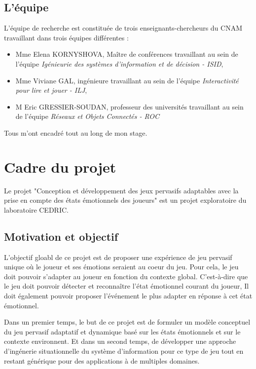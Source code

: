 \documentclass{article}
\begin{document}
	\subsection{L'équipe}
		L'équipe de recherche est constituée de trois enseignants-chercheurs du CNAM travaillant dans trois équipes différentes :
		\begin{itemize}
			\item Mme Elena KORNYSHOVA, Maître de conférences travaillant au sein de l'équipe \textit{Igénieurie des systèmes d'information et de décision - ISID}, 
			\item Mme Viviane GAL, ingénieure travaillant au sein de l'équipe \textit{Interactivité pour lire et jouer - ILJ},
			\item M Eric GRESSIER-SOUDAN, professeur des universités travaillant au sein de l'équipe \textit{Réseaux et Objets Connectés - ROC}
		\end{itemize}
		Tous m'ont encadré tout au long de mon stage.

\section{Cadre du projet}
	Le projet "Conception et développement des jeux pervasifs adaptables avec la prise en compte des états émotionnels des joueurs" est un projet exploratoire du laboratoire CEDRIC.
	\subsection{Motivation et objectif}
		L'objectif gloabl de ce projet est de proposer une expérience de jeu pervasif unique où le joueur et ses émotions seraient au coeur du jeu. 
		Pour cela, le jeu doit pouvoir s'adapter au joueur en fonction du contexte global. 
		C'est-à-dire que le jeu doit pouvoir détecter et reconnaître l'état émotionnel courant du joueur,
		Il doit également pouvoir proposer l'événement le plus adapter en réponse à cet état émotionnel.\par
		Dans un premier temps, le but de ce projet est de formuler un modèle conceptuel du jeu pervasif adaptatif et dynamique basé sur les états émotionnels et sur le contexte environnent. 
		Et dans un second temps, de développer une approche d'ingénerie situationnelle du système d'information pour ce type de jeu tout en restant générique pour des applications à de multiples domaines.
\end{document}
